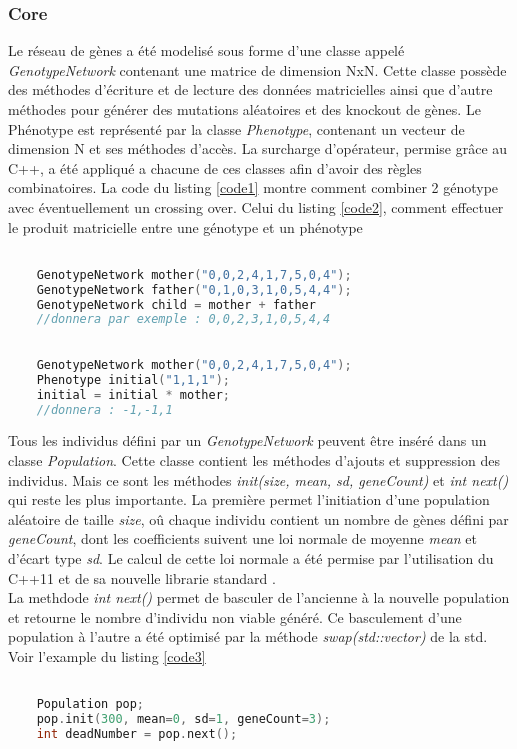\documentclass{article}
\begin{document}
	\subsubsection {Core}
	Le réseau de gènes a été modelisé sous forme d'une classe appelé \emph{GenotypeNetwork} contenant une matrice de dimension NxN. Cette classe possède des méthodes d'écriture et de lecture des données matricielles ainsi que d'autre méthodes pour générer des mutations aléatoires et des knockout de gènes.
	Le Phénotype est représenté par la classe  \emph{Phenotype}, contenant un vecteur de dimension N et ses méthodes d’accès. 
	La surcharge d’opérateur, permise grâce au C++, a été appliqué a chacune de ces classes afin d'avoir des règles combinatoires. La code du listing \ref{code1} montre comment combiner 2 génotype avec éventuellement un crossing over.  Celui du listing \ref{code2}, comment effectuer le produit matricielle entre une génotype et un phénotype

	\begin{lstlisting}[language=C++, caption=Addition de genotype, label={code1}]

	GenotypeNetwork mother("0,0,2,4,1,7,5,0,4");
	GenotypeNetwork father("0,1,0,3,1,0,5,4,4");
	GenotypeNetwork child = mother + father
	//donnera par exemple : 0,0,2,3,1,0,5,4,4
	\end{lstlisting}

	\begin{lstlisting}[language=C++, caption=produit d'un genotype et d'un phenotype, label={code2}]

	GenotypeNetwork mother("0,0,2,4,1,7,5,0,4");
	Phenotype initial("1,1,1");
	initial = initial * mother;
	//donnera : -1,-1,1
	\end{lstlisting}

	Tous les individus défini par un \emph{GenotypeNetwork} peuvent être inséré dans un classe \emph{Population}. Cette classe contient les méthodes d'ajouts et suppression des individus. Mais ce sont les méthodes \emph{init(size, mean, sd, geneCount)} et \emph{int next()} qui reste les plus importante. La première permet l'initiation d'une population aléatoire de taille \emph{size}, oû chaque individu contient un nombre de gènes défini par \emph{geneCount}, dont les coefficients suivent une loi normale de moyenne \emph{mean} et d’écart type \emph{sd}. Le calcul de cette loi normale a été permise par l'utilisation du C++11 et de sa nouvelle librarie standard . \\
	La methdode \emph{int next()} permet de basculer de l'ancienne à la nouvelle population et retourne le nombre d'individu non viable généré. Ce basculement d'une population à l'autre a été optimisé par la méthode \emph{swap(std::vector)} de la std. Voir l'example du listing \ref{code3} 
	\\
	\begin{lstlisting}[language=C++, caption=Generation d'une population et basculement vers la génération suivante, label={code3}]

	Population pop;
	pop.init(300, mean=0, sd=1, geneCount=3); 
	int deadNumber = pop.next();

	\end{lstlisting}
\end{document}
